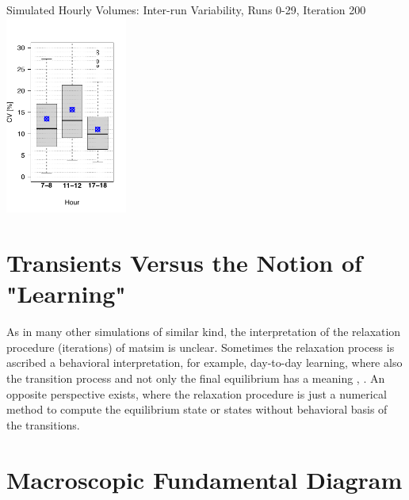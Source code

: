 {	{\label{fig:linkVolumesHour17-18InterScatter}}%
  {}%
	\createsubfigure%
  {Simulated Hourly Volumes: Inter-run Variability, Runs 0-29, Iteration 200}%
	{\includegraphics[width=0.3\textwidth]{understanding/figures/var/linkVolumesInter200.pdf}}%
	{\label{fig:linkVolumesInter200}}%
  {}%
}%
{} 

\vfill\eject
\section{Transients Versus the Notion of "Learning"}
\label{sec:transients-vs-learning}

As in many other simulations of similar kind, the interpretation of the relaxation procedure (iterations) of \gls{matsim} is unclear. 
%
Sometimes the relaxation process is ascribed a behavioral interpretation, for example, day-to-day learning, where also the transition process and not only the final equilibrium has a meaning \citep[][p.128]{LiuEtAl_TransResA_2006}, \citep[][p.523]{NagelBarrett_IJMPC_1997}. 
%
An opposite perspective exists, where the relaxation procedure is just a numerical method to compute the equilibrium state or states without behavioral basis of the transitions.


\vfill\eject
\section{Macroscopic Fundamental Diagram}
\label{sec:researchavenues-mfd}


\vfill\eject
